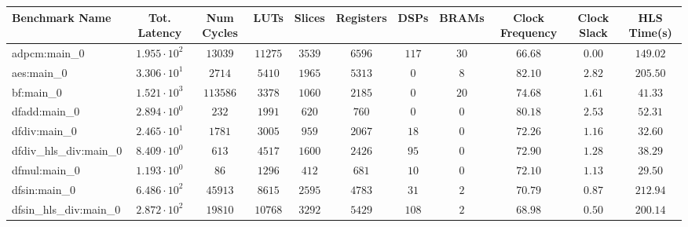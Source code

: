 \begin{tabular}{|l|c|c|c|c|c|c|c|c|c|c|}
\hline
Benchmark Name          & Tot. Latency           & Num Cycles & LUTs      & Slices    & Registers & DSPs    & BRAMs   & Clock Frequency & Clock Slack & HLS Time(s) \\
\hline
adpcm:main\_0           & $ 1.955 \cdot 10^{2} $ & $ 13039  $ & $ 11275 $ & $ 3539  $ & $ 6596  $ & $ 117 $ & $ 30  $ & $ 66.68       $ & $ 0.00    $ & $ 149.02  $ \\
aes:main\_0             & $ 3.306 \cdot 10^{1} $ & $ 2714   $ & $ 5410  $ & $ 1965  $ & $ 5313  $ & $ 0   $ & $ 8   $ & $ 82.10       $ & $ 2.82    $ & $ 205.50  $ \\
bf:main\_0              & $ 1.521 \cdot 10^{3} $ & $ 113586 $ & $ 3378  $ & $ 1060  $ & $ 2185  $ & $ 0   $ & $ 20  $ & $ 74.68       $ & $ 1.61    $ & $ 41.33   $ \\
dfadd:main\_0           & $ 2.894 \cdot 10^{0} $ & $ 232    $ & $ 1991  $ & $ 620   $ & $ 760   $ & $ 0   $ & $ 0   $ & $ 80.18       $ & $ 2.53    $ & $ 52.31   $ \\
dfdiv:main\_0           & $ 2.465 \cdot 10^{1} $ & $ 1781   $ & $ 3005  $ & $ 959   $ & $ 2067  $ & $ 18  $ & $ 0   $ & $ 72.26       $ & $ 1.16    $ & $ 32.60   $ \\
dfdiv\_hls\_div:main\_0 & $ 8.409 \cdot 10^{0} $ & $ 613    $ & $ 4517  $ & $ 1600  $ & $ 2426  $ & $ 95  $ & $ 0   $ & $ 72.90       $ & $ 1.28    $ & $ 38.29   $ \\
dfmul:main\_0           & $ 1.193 \cdot 10^{0} $ & $ 86     $ & $ 1296  $ & $ 412   $ & $ 681   $ & $ 10  $ & $ 0   $ & $ 72.10       $ & $ 1.13    $ & $ 29.50   $ \\
dfsin:main\_0           & $ 6.486 \cdot 10^{2} $ & $ 45913  $ & $ 8615  $ & $ 2595  $ & $ 4783  $ & $ 31  $ & $ 2   $ & $ 70.79       $ & $ 0.87    $ & $ 212.94  $ \\
dfsin\_hls\_div:main\_0 & $ 2.872 \cdot 10^{2} $ & $ 19810  $ & $ 10768 $ & $ 3292  $ & $ 5429  $ & $ 108 $ & $ 2   $ & $ 68.98       $ & $ 0.50    $ & $ 200.14  $ \\

\end{tabular}
